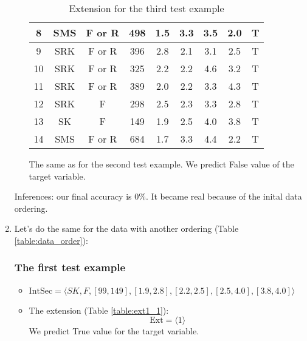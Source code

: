 \documentclass[12pt]{report}
\begin{document}
\begin{solution}
\begin{enumerate}
\begin{itemize}
\begin{table}[H]
\begin{tabular}{|c|c|c|c|c|c|c|c|c|}
                8  & \cellcolor[HTML]{FE0000}SMS & F or R & 498                         & 1.5                         & 3.3  & 3.5 & 2.0 & T         \\ \hline
                9  & \cellcolor[HTML]{FE0000}SRK & F or R & 396                         & 2.8                         & 2.1  & 3.1 & 2.5 & T         \\ \hline
                10 & \cellcolor[HTML]{FE0000}SRK & F or R & 325                         & 2.2                         & 2.2  & 4.6 & 3.2 & T         \\ \hline
                11 & \cellcolor[HTML]{FE0000}SRK & F or R & 389                         & 2.0                         & 2.2  & 3.3 & 4.3 & T         \\ \hline
                12 & \cellcolor[HTML]{FE0000}SRK & F      & 298                         & 2.5                         & 2.3  & 3.3 & 2.8 & T         \\ \hline
                13 &
                  SK &
                  F &
                  \cellcolor[HTML]{FE0000}149 &
                  1.9 &
                  \cellcolor[HTML]{FFFFFF}2.5 &
                  \cellcolor[HTML]{FFFFFF}4.0 &
                  3.8 &
                  T \\ \hline
                14 & \cellcolor[HTML]{FE0000}SMS & F or R & 684                         & 1.7                         & 3.3  & 4.4 & 2.2 & T         \\ \hline
                \end{tabular}
                \caption{Extension for the third test example}
                \label{table:ext3}
                \end{table}
            The same as for the second test example. We predict False value of the target variable. 
        \end{itemize}
        \par
            Inferences: our final accuracy is $0\%$. It became real because of the inital data ordering.
            \item Let's do the same for the data with another ordering (Table \ref{table:data_order}):
            \vspace*{-0.3cm}
            
            \subsubsection*{The first test example}
            \begin{itemize}
              \item $\text{IntSec} = \langle SK, F, [99, 149], [1.9, 2.8], [2.2, 2.5], [2.5, 4.0], [3.8, 4.0]\rangle$
              \item The extension (Table \ref{table:ext1_1}):
              \useshortskip
              \[
                  \text{Ext} = \langle 1\rangle
              \]
              \useshortskip
              We predict True value for the target variable.
              \vspace*{-0.3cm}


\end{itemize}
\end{enumerate}
\end{solution}
\end{document}
